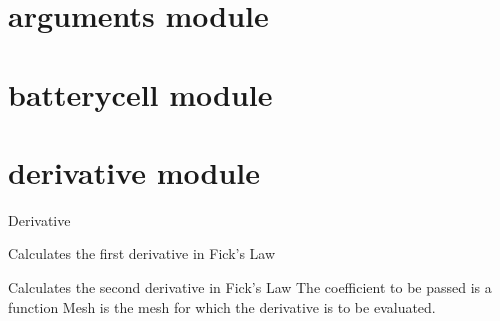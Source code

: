 \documentclass[letterpaper,10pt,english]{sphinxmanual}
\begin{document}
\section{arguments module}
\label{\detokenize{arguments:arguments-module}}\label{\detokenize{arguments::doc}}

\section{batterycell module}
\label{\detokenize{batterycell:batterycell-module}}\label{\detokenize{batterycell::doc}}

\section{derivative module}
\label{\detokenize{derivative:module-derivative}}\label{\detokenize{derivative:derivative-module}}\label{\detokenize{derivative::doc}}
\sphinxAtStartPar
Derivative

\begin{fulllineitems}
\label{\detokenize{derivative:derivative.first_derivative}}
\sphinxAtStartPar
Calculates the first derivative in Fick’s Law

\end{fulllineitems}


\begin{fulllineitems}
\label{\detokenize{derivative:derivative.second_derivative}}
\sphinxAtStartPar
Calculates the second derivative in Fick’s Law
The coefficient to be passed is a function
Mesh is the mesh for which the derivative is to be evaluated.

\end{fulllineitems}
\end{document}
